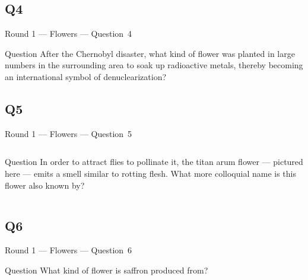 \documentclass[11pt]{beamer}
\begin{document}
\subsection*{Q4}
\begin{frame}[t]{Round 1 --- Flowers --- \mbox{Question 4}}
\vspace{-0.5em}
\begin{block}{Question}
After the Chernobyl disaster, what kind of flower was planted in large numbers in the surrounding area to soak up radioactive metals, thereby becoming an international symbol of denuclearization?
\end{block}
\end{frame}
\subsection*{Q5}
\begin{frame}[t]{Round 1 --- Flowers --- \mbox{Question 5}}
\vspace{-0.5em}
\begin{columns}[T,totalwidth=\linewidth]
\begin{column}{0.32\linewidth}
\begin{block}{Question}
In order to attract flies to pollinate it, the titan arum flower --- pictured here --- emits a smell similar to rotting flesh. What more colloquial name is this flower also known by?
\end{block}
\end{column}
\begin{column}{0.65\linewidth}
\begin{center}
\texttt{[image: \{Images/corpse]}.jpg}
\end{center}
\end{column}
\end{columns}
\end{frame}
\subsection*{Q6}
\begin{frame}[t]{Round 1 --- Flowers --- \mbox{Question 6}}
\vspace{-0.5em}
\begin{block}{Question}
What kind of flower is saffron produced from?
\end{block}
\end{frame}
\end{document}
